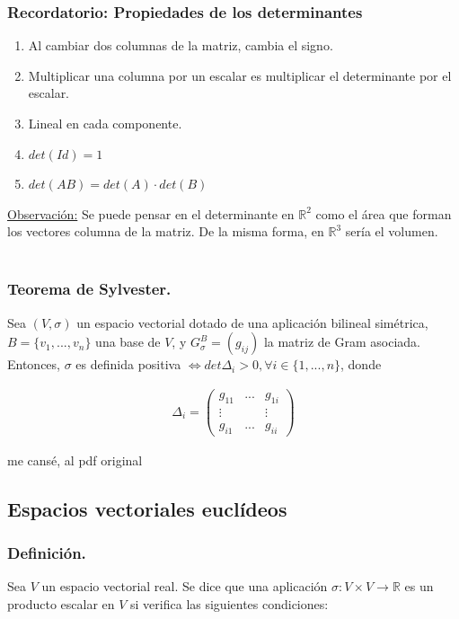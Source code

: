 \documentclass[12pt, a4paper, ones, notitlepage, openany,titlepage]{article}
\begin{document}
\subsubsection{Recordatorio: Propiedades de los determinantes}
\begin{enumerate}
	\item Al cambiar dos columnas de la matriz, cambia el signo.
	\item Multiplicar una columna por un escalar es multiplicar el determinante por el escalar.
	\item Lineal en cada componente.
	\item $det(Id) = 1$
	\item $det(AB) = det(A) \cdot det(B)$
\end{enumerate}
\underline{Observación:} Se puede pensar en el determinante en $\mathbb{R}^2$ como el área que forman los vectores columna de la matriz. De la misma forma, en $\mathbb{R}^3$ sería el volumen.\\\\

\subsubsection{Teorema de Sylvester.}
Sea $(V,\sigma)$ un espacio vectorial dotado de una aplicación bilineal simétrica, $B = \{v_1,...,v_n\}$ una base de $V$, y $G_\sigma^B = (g_{ij})$ la matriz de Gram asociada. Entonces, $\sigma$ es definida positiva $\Longleftrightarrow det\Delta_i > 0, \forall i \in \{1,...,n\}$, donde

\begin{align*}
	\Delta_i = \left(
	\begin{matrix}
		g_{11} & ... & g_{1i} \\
		\vdots &     & \vdots \\
		g_{i1} & ... & g_{ii}
	\end{matrix}
	\right)
\end{align*}

me cansé, al pdf original

\subsection{Espacios vectoriales euclídeos}
\subsubsection{Definición.} Sea $V$ un espacio vectorial real. Se dice que una aplicación $\sigma: V \times V \rightarrow \mathbb{R}$ es un producto escalar en $V$ si verifica las siguientes condiciones:
\end{document}
